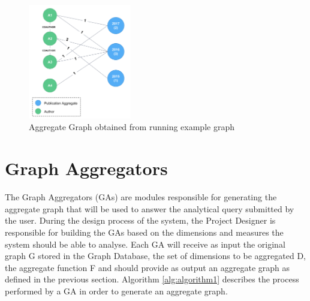 \begin{figure}[!ht]
\centering
\caption{Aggregate Graph obtained from running example graph}
\label{fig:figure28}
\includegraphics[width=0.4\textwidth]{images/aggregate_graph_running_example.png}
\end{figure}

\section{Graph Aggregators}

The Graph Aggregators (GAs) are modules responsible for generating the aggregate graph that will be used to answer the analytical query submitted by the user. During the design process of the system, the Project Designer is responsible for building the GAs based on the dimensions and measures the system should be able to analyse. Each GA will receive as input the original graph G stored in the Graph Database, the set of dimensions to be aggregated D, the aggregate function F and should provide as output an aggregate graph as defined in the previous section. Algorithm \ref{alg:algorithm1} describes the process performed by a GA in order to generate an aggregate graph.

